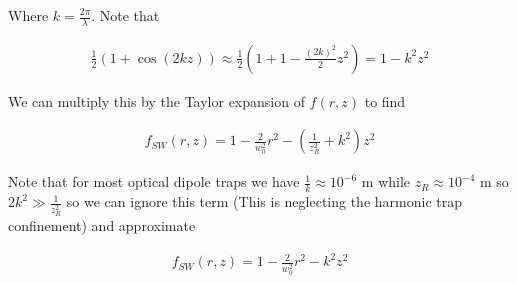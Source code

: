 \documentclass[12pt]{article}
\begin{document}
Where $k = \frac{2\pi}{\lambda}$. Note that

\begin{align}
\frac{1}{2}(1+\cos(2kz)) \approx \frac{1}{2}(1+ 1 - \frac{(2k)^2}{2} z^2) = 1-k^2z^2
\end{align}

We can multiply this by the Taylor expansion of $f(r,z)$ to find

\begin{align}
f_{SW}(r,z) = 1 - \frac{2}{w_0^2} r^2 - \left(\frac{1}{z_R^2} + k^2\right)z^2
\end{align}

Note that for most optical dipole traps we have $\frac{1}{k} \approx 10^{-6} \text{ m}$ while $z_R \approx 10^{-4} \text{ m}$ so $2k^2 \gg \frac{1}{z_R^2}$ so we can ignore this term (This is neglecting the harmonic trap confinement) and approximate

\begin{align}
f_{SW}(r,z) = 1 - \frac{2}{w_0^2} r^2 - k^2z^2
\end{align}
\end{document}
